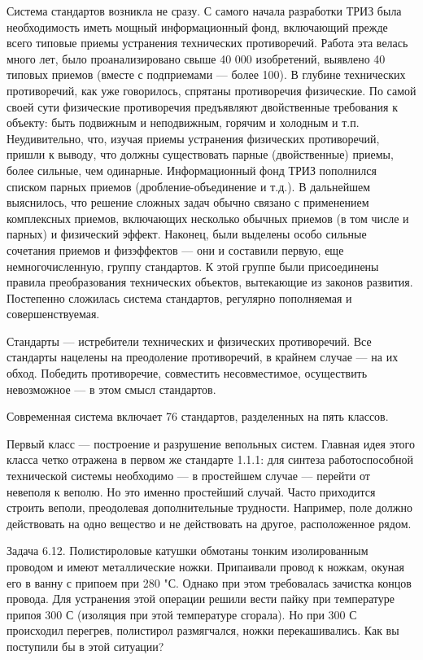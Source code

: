 Система стандартов возникла не сразу.  С самого начала разработки ТРИЗ
была необходимость иметь мощный информационный фонд, включающий прежде
всего типовые  приемы устранения технических противоречий.  Работа эта
велась  много лет,  было  проанализировано свыше  40 000  изобретений,
выявлено  40  типовых приемов  (вместе  с  подприемами —  более  100).
В  глубине  технических  противоречий, как  уже  говорилось,  спрятаны
противоречия физические.  По самой своей сути  физические противоречия
предъявляют  двойственные  требования  к  объекту:  быть  подвижным  и
неподвижным,  горячим и  холодным  и т.п.  Неудивительно, что,  изучая
приемы  устранения  физических  противоречий,  пришли  к  выводу,  что
должны существовать  парные (двойственные) приемы, более  сильные, чем
одинарные. Информационный фонд ТРИЗ  пополнился списком парных приемов
(дробление-объединение и  т.д.). В дальнейшем выяснилось,  что решение
сложных  задач  обычно  связано  с  применением  комплексных  приемов,
включающих  несколько  обычных  приемов  (в  том  числе  и  парных)  и
физический  эффект. Наконец,  были  выделены  особо сильные  сочетания
приемов и физэффектов — они  и составили первую, еще немногочисленную,
группу   стандартов.  К   этой   группе   были  присоединены   правила
преобразования технических  объектов, вытекающие из  законов развития.
Постепенно  сложилась  система  стандартов,  регулярно  пополняемая  и
совершенствуемая.

Стандарты  — истребители  технических и  физических противоречий.  Все
стандарты нацелены на преодоление противоречий,  в крайнем случае — на
их обход. Победить противоречие, совместить несовместимое, осуществить
невозможное — в этом смысл стандартов.


Современная  система  включает  76  стандартов,  разделенных  на  пять
классов.

Первый класс — построение и  разрушение вепольных систем. Главная идея
этого класса четко  отражена в первом же стандарте  1.1.1: для синтеза
работоспособной технической системы необходимо — в простейшем случае —
перейти  от  невеполя  к  веполю. Но  это  именно  простейший  случай.
Часто приходится строить веполи, преодолевая дополнительные трудности.
Например, поле должно действовать на одно вещество и не действовать на
другое, расположенное рядом.

Задача  6.12.  Полистироловые  катушки обмотаны  тонким  изолированным
проводом  и имеют  металлические  ножки. Припаивали  провод к  ножкам,
окуная его в  ванну с припоем при 280 "С.  Однако при этом требовалась
зачистка  концов провода.  Для устранения  этой операции  решили вести
пайку при  температуре припоя  300 С  (изоляция при  этой температуре
сгорала). Но  при 300 С происходил  перегрев, полистирол размягчался,
ножки перекашивались. Как вы поступили бы в этой ситуации?

